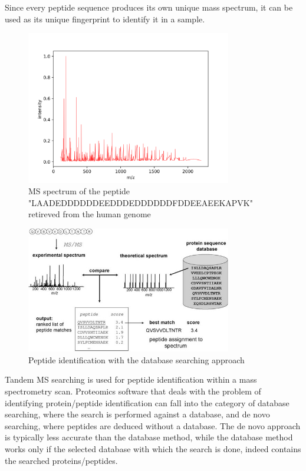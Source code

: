 \documentclass[11pt]{article}
\begin{document}
Since every peptide sequence produces its own unique mass spectrum, it can be used as its unique fingerprint to identify it in a sample.
\begin{figure}[ht]
\centering
\includegraphics[width=0.8\textwidth]{figs/peptide.png}
\caption{MS spectrum of the peptide "LAADEDDDDDDEEDDDEDDDDDDFDDEEAEEKAPVK" retireved from the human genome}
\label{fig:peptide-example}
\end{figure}
\begin{figure}[ht]
\centering
\includegraphics[width=0.8\textwidth]{figs/database_search.jpg}
\caption{Peptide identification with the database searching approach \cite{Nesvizhskii2007}}
\label{fig:database-search}
\end{figure}
Tandem MS searching is used for peptide identification within a mass spectrometry scan. Proteomics software that deals with the problem of identifying protein/peptide identification can fall into the category of database searching, where the search is performed against a database, and de novo searching, where peptides are deduced without a database. The de novo approach is typically less accurate than the database method, while the database method works only if the selected database with which the search is done, indeed contains the searched proteins/peptides.
\end{document}
